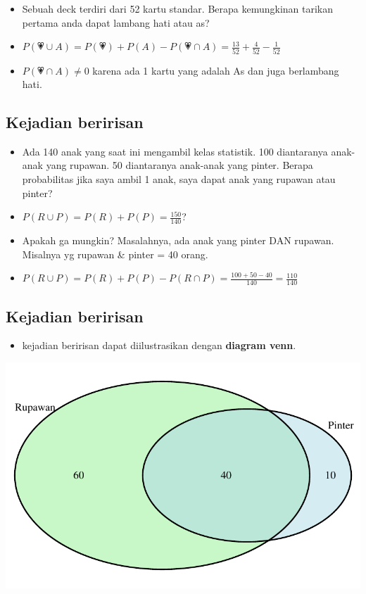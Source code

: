 \documentclass[
  letterpaper,
  DIV=11,
  numbers=noendperiod]{scrartcl}
\providecommand{\tightlist}{%
  \setlength{\itemsep}{0pt}\setlength{\parskip}{0pt}}\usepackage{longtable,booktabs,array}
\begin{document}
\begin{itemize}
\item
  Sebuah deck terdiri dari 52 kartu standar. Berapa kemungkinan tarikan
  pertama anda dapat lambang hati atau as?
\item
  \(P(💗 \cup A)=P(💗)+P(A)-P(💗 \cap A)=\frac{13}{52}+\frac{4}{52}-\frac{1}{52}\)
\item
  \(P(💗 \cap A) \neq 0\) karena ada 1 kartu yang adalah As dan juga
  berlambang hati.
\end{itemize}

\hypertarget{kejadian-beririsan-1}{%
\subsection{Kejadian beririsan}\label{kejadian-beririsan-1}}

\begin{itemize}
\item
  Ada 140 anak yang saat ini mengambil kelas statistik. 100 diantaranya
  anak-anak yang rupawan. 50 diantaranya anak-anak yang pinter. Berapa
  probabilitas jika saya ambil 1 anak, saya dapat anak yang rupawan atau
  pinter?
\item
  \(P(R \cup P)=P(R)+P(P)=\frac{150}{140}\)?
\item
  Apakah ga mungkin? Masalahnya, ada anak yang pinter DAN rupawan.
  Misalnya yg rupawan \& pinter = 40 orang.
\item
  \(P(R \cup P)=P(R)+P(P)-P(R\cap P)=\frac{100+50-40}{140}=\frac{110}{140}\)
\end{itemize}

\hypertarget{kejadian-beririsan-2}{%
\subsection{Kejadian beririsan}\label{kejadian-beririsan-2}}

\begin{itemize}
\tightlist
\item
  kejadian beririsan dapat diilustrasikan dengan \textbf{diagram venn}.
\end{itemize}

\includegraphics{index_files/figure-pdf/unnamed-chunk-11-1.pdf}
\end{document}
